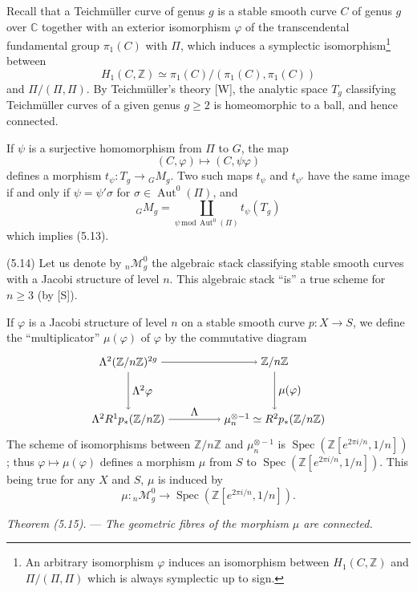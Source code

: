 \documentclass[10pt]{article}
\newcommand{\Spec}{\operatorname{Spec}}
\newcommand{\Aut}{\operatorname{Aut}}
\begin{document}
Recall that a Teichmüller curve of genus $g$ is a stable smooth curve $C$ of genus $g$ over $\mathbb C$ together with an exterior isomorphism $\varphi$ of the transcendental fundamental group $\pi_1(C)$ with $\Pi$, which induces a symplectic isomorphism\footnote{An arbitrary isomorphism $\varphi$ induces an isomorphism between $H_1(C,\mathbb Z)$ and $\Pi/(\Pi,\Pi)$ which is always symplectic up to sign.} between
\[
H_1(C,\mathbb Z)\simeq \pi_1(C)/(\pi_1(C),\pi_1(C))
\]
and $\Pi/(\Pi,\Pi)$. By Teichmüller's theory [W], the analytic space $T_g$ classifying Teichmüller curves of a given genus $g\geq2$ is homeomorphic to a ball, and hence connected.

If $\psi$ is a surjective homomorphism from $\Pi$ to $G$, the map
\[
(C,\varphi)\longmapsto (C,\psi\varphi)
\]
defines a morphism $t_\psi:T_g\to{}_GM_g$. Two such maps $t_\psi$ and $t_{\psi'}$ have the same image if and only if $\psi=\psi'\sigma$ for $\sigma\in\Aut^0(\Pi)$, and
\[
{}_GM_g=\coprod_{\psi\,\mathrm{mod}\,\Aut^0(\Pi)} t_\psi(T_g)
\]
which implies (5.13).

\medskip
\noindent(5.14) Let us denote by ${}_n\mathcal M_g^0$ the algebraic stack classifying stable smooth curves with a Jacobi structure of level $n$. This algebraic stack ``is'' a true scheme for $n\geq3$ (by [S]).

If $\varphi$ is a Jacobi structure of level $n$ on a stable smooth curve $p:X\to S$, we define the ``multiplicator'' $\mu(\varphi)$ of $\varphi$ by the commutative diagram
\[
\begin{tikzpicture}[baseline=(current bounding box.center)]
\node (A) at (0,1.8) {$\Lambda^2(\mathbb Z/n\mathbb Z)^{2g}$};
\node (B) at (4.6,1.8) {$\mathbb Z/n\mathbb Z$};
\node (C) at (0,0) {$\Lambda^2R^1p_*(\mathbb Z/n\mathbb Z)$};
\node (D) at (4.6,0) {$\mu_n^{\otimes -1}\simeq R^2p_*(\mathbb Z/n\mathbb Z)$};
\draw[->] (A) -- (B);
\draw[->] (C) -- node[above] {$\Lambda$} (D);
\draw[->] (A) -- node[right] {$\Lambda^2\varphi$} (C);
\draw[->] (B) -- node[right] {$\mu(\varphi)$} (D);
\end{tikzpicture}
\]
The scheme of isomorphisms between $\mathbb Z/n\mathbb Z$ and $\mu_n^{\otimes -1}$ is $\Spec(\mathbb Z[e^{2\pi i/n},1/n])$; thus $\varphi\mapsto\mu(\varphi)$ defines a morphism $\mu$ from $S$ to $\Spec(\mathbb Z[e^{2\pi i/n},1/n])$. This being true for any $X$ and $S$, $\mu$ is induced by
\[
\mu:{}_n\mathcal M_g^0\longrightarrow \Spec(\mathbb Z[e^{2\pi i/n},1/n]).
\]

\medskip
\noindent\emph{Theorem (5.15).} --- \emph{The geometric fibres of the morphism $\mu$ are connected.}
\end{document}
